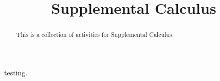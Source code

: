 \documentclass{ximera}
\title{Supplemental Calculus}
\begin{document}
\begin{abstract}
This is a collection of activities for Supplemental Calculus.
\end{abstract}

\maketitle


%
%
%
%
%
%
%
%
%


testing.
\end{document}
